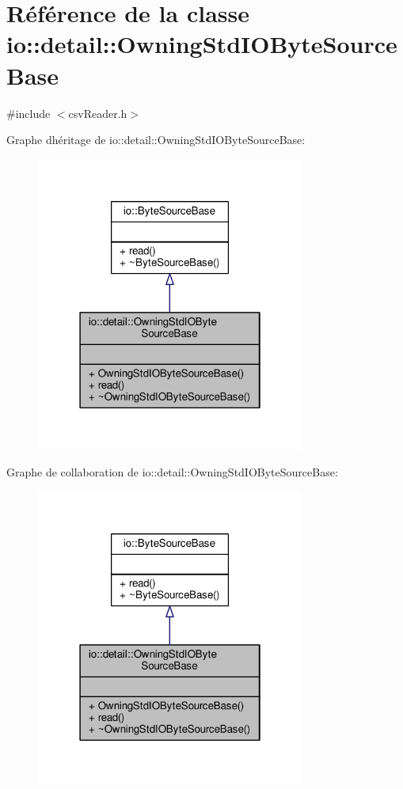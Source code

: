 \hypertarget{classio_1_1detail_1_1OwningStdIOByteSourceBase}{}\section{Référence de la classe io\+:\+:detail\+:\+:Owning\+Std\+I\+O\+Byte\+Source\+Base}
\label{classio_1_1detail_1_1OwningStdIOByteSourceBase}


{\ttfamily \#include $<$csv\+Reader.\+h$>$}



Graphe d\textquotesingle{}héritage de io\+:\+:detail\+:\+:Owning\+Std\+I\+O\+Byte\+Source\+Base\+:\nopagebreak
\begin{figure}[H]
\begin{center}
\leavevmode
\includegraphics[width=250pt]{classio_1_1detail_1_1OwningStdIOByteSourceBase__inherit__graph}
\end{center}
\end{figure}


Graphe de collaboration de io\+:\+:detail\+:\+:Owning\+Std\+I\+O\+Byte\+Source\+Base\+:\nopagebreak
\begin{figure}[H]
\begin{center}
\leavevmode
\includegraphics[width=250pt]{classio_1_1detail_1_1OwningStdIOByteSourceBase__coll__graph}
\end{center}
\end{figure}
